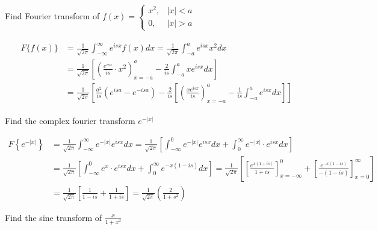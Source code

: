 \begin{exercise}
	Find Fourier transform of $f(x)= \begin{cases}x^{2}, & |x|<a \\ 0, & |x|>a\end{cases}$
\end{exercise}
\begin{answer}
	\begin{align*}
	\begin{aligned}
	F\{f(x)\} &=\frac{1}{\sqrt{2 \pi}} \int_{-\infty}^{\infty} e^{i s x} f(x) d x=\frac{1}{\sqrt{2 \pi}} \int_{-a}^{a} e^{i s x} x^{2} d x \\
	&=\frac{1}{\sqrt{2 \pi}}\left[\left(\frac{e^{i s x}}{i s} \cdot x^{2}\right)_{x=-a}^{a}-\frac{2}{i s} \int_{-a}^{a} x e^{i s x} d x\right] \\
	&=\frac{1}{\sqrt{2 \pi}}\left[\frac{a^{2}}{i s}\left(e^{i s a}-e^{-i s a}\right)-\frac{2}{i s}\left[\left(\frac{x e^{i s x}}{i s}\right)_{x=-a}^{a}-\frac{1}{i s} \int_{-a}^{a} e^{i s x} d x\right]\right]
	\end{aligned}
	\end{align*}
\end{answer}
\begin{exercise}
	Find the complex fourier transform $e^{-|x|}$
\end{exercise}
\begin{answer}
	\begin{align*}
	F\left\{e^{-|x|}\right\}&=\frac{1}{\sqrt{2 \pi}} \int_{-\infty}^{\infty} e^{-|x|} e^{i s x} d x=\frac{1}{\sqrt{2 \pi}}\left[\int_{-\infty}^{0} e^{-|x|} e^{i s x} d x+\int_{0}^{\infty} e^{-|x|} \cdot e^{i s x} d x\right]\\
	&=\frac{1}{\sqrt{2 \pi}}\left[\int_{-\infty}^{0} e^{x} \cdot e^{i s x} d x+\int_{0}^{\infty} e^{-x(1-i s)} d x\right]=\frac{1}{\sqrt{2 \pi}}\left[\left[\frac{e^{x(1+i s)}}{1+i s}\right]_{x=-\infty}^{0}+\left[\frac{e^{-x(1-i s)}}{-(1-i s)}\right]_{x=0}^{\infty}\right] \\
	&=\frac{1}{\sqrt{2 \pi}}\left[\frac{1}{1-i s}+\frac{1}{1+i s}\right]=\frac{1}{\sqrt{2 \pi}}\left(\frac{2}{1+s^{2}}\right)
	\end{align*}
\end{answer}
\begin{exercise}
	Find the sine transform of $\frac{x}{1+x^{2}}$
\end{exercise}
